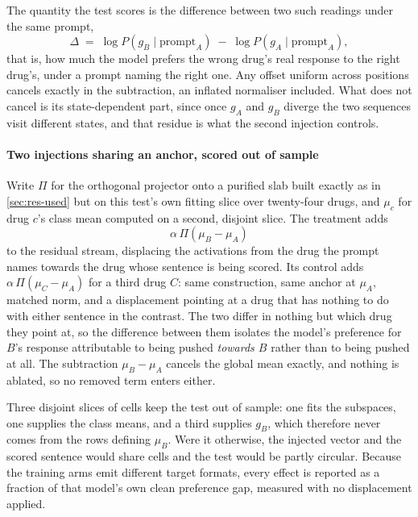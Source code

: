 The quantity the test scores is the difference between two such readings under
the same prompt,
\begin{equation}
  \Delta \;=\;
  \log P\!\left(g_B \mid \textrm{prompt}_A\right) \;-\;
  \log P\!\left(g_A \mid \textrm{prompt}_A\right),
\end{equation}
that is, how much the model prefers the wrong drug's real response to the right
drug's, under a prompt naming the right one. Any offset uniform across positions
cancels exactly in the subtraction, an inflated normaliser included. What does
not cancel is its state-dependent part, since once $g_A$ and $g_B$ diverge the
two sequences visit different states, and that residue is what the second
injection controls.

\paragraph{Two injections sharing an anchor, scored out of sample} Write $\Pi$ for the orthogonal projector onto a purified slab built exactly as in \cref{sec:res-used} but on this test's own fitting slice over twenty-four drugs, and $\mu_c$ for drug $c$'s class mean computed on a second, disjoint slice. The treatment adds
\begin{equation}
  \alpha \, \Pi\!\left(\mu_B - \mu_A\right)
\end{equation}
to the residual stream, displacing the activations from the drug the prompt
names towards the drug whose sentence is being scored. Its control adds
$\alpha\,\Pi(\mu_C - \mu_A)$ for a third drug $C$: same construction, same
anchor at $\mu_A$, matched norm, and a displacement pointing at a drug that has
nothing to do with either sentence in the contrast. The two differ in nothing
but which drug they point at, so the difference between them isolates the
model's preference for $B$'s response attributable to being pushed
\emph{towards $B$} rather than to being pushed at all. The subtraction
$\mu_B - \mu_A$ cancels the global mean exactly, and nothing is ablated, so no
removed term enters either.

Three disjoint slices of cells keep the test out of sample: one fits the
subspaces, one supplies the class means, and a third supplies $g_B$, which
therefore never comes from the rows defining $\mu_B$. Were it otherwise, the
injected vector and the scored sentence would share cells and the test would be
partly circular. Because the training arms emit different target formats, every
effect is reported as a fraction of that model's own clean preference gap,
measured with no displacement applied.

